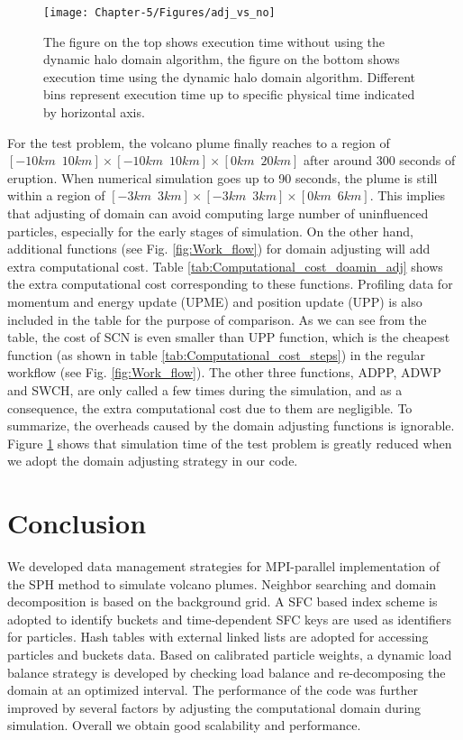 \begin{figure}
\centering
{\texttt{[image: Chapter-5/Figures/adj\_vs\_no]}}
{\caption{The figure on the top shows execution time without using the dynamic halo domain algorithm, the figure on the bottom shows execution time using the dynamic halo domain algorithm. Different bins represent execution time up to specific physical time indicated by horizontal axis.}
\label{fig:adj_vs_no}}
\end{figure}

For the test problem, the volcano plume finally reaches to a region of $[-10km \,\,\, 10km] \times [-10km\,\,\,10km] \times [0km\,\,\,20km]$ after around 300 seconds of eruption. When numerical simulation goes up to 90 seconds, the plume is still within a region of $[-3km\,\,\,3km] \times [-3km\,\,\,3km] \times [0km\,\,\,6km]$. This implies that adjusting of domain can avoid computing large number of uninfluenced particles, especially for the early stages of simulation. On the other hand, additional functions (see Fig. \ref{fig:Work_flow}) for domain adjusting will add extra computational cost. Table \ref{tab:Computational_cost_doamin_adj} shows the extra computational cost corresponding to these functions. Profiling data for momentum and energy update (UPME) and position update (UPP) is also included in the table for the purpose of comparison. As we can see from the table, the cost of SCN is even smaller than UPP function, which is the cheapest function (as shown in table \ref{tab:Computational_cost_steps}) in the regular workflow (see Fig. \ref{fig:Work_flow}). The other three functions, ADPP, ADWP and SWCH, are only called a few times during the simulation, and as a consequence, the extra computational cost due to them are negligible. To summarize, the overheads caused by the domain adjusting functions is ignorable.
Figure \ref{fig:adj_vs_no} shows that simulation time of the test problem is greatly reduced when we adopt the domain adjusting strategy in our code.

\section{Conclusion}
We developed data management strategies for MPI-parallel implementation of the SPH method to simulate volcano plumes. Neighbor searching and domain decomposition is based on the background grid. A SFC based index scheme is adopted to identify buckets and time-dependent SFC keys are used as identifiers for particles. 
Hash tables with external linked lists are adopted for accessing particles and buckets data. Based on calibrated particle weights, a dynamic load balance strategy is developed by checking load balance and re-decomposing the domain at an optimized interval. The performance of the code was further improved by several factors by adjusting the computational domain during simulation.
Overall we obtain good scalability and performance.

